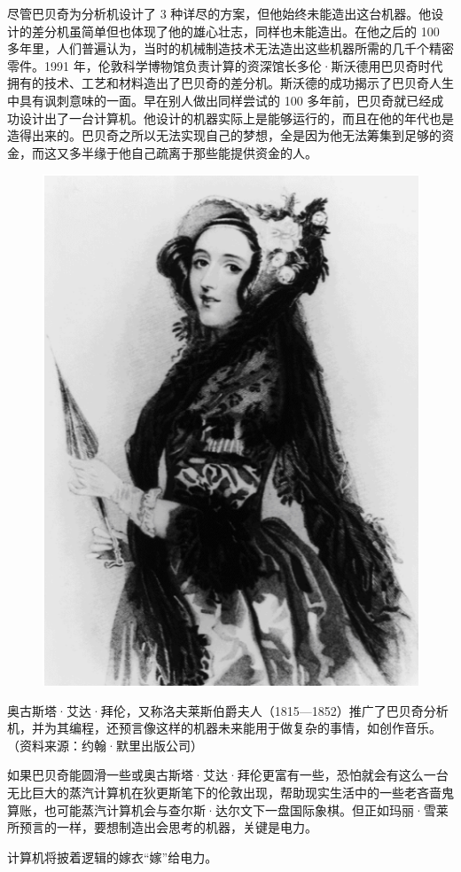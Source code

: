 \documentclass[12pt,UTF8]{ctexbook}
\begin{document}
尽管巴贝奇为分析机设计了 3 种详尽的方案，但他始终未能造出这台机器。他设计的差分机虽简单但也体现了他的雄心壮志，同样也未能造出。在他之后的 100 多年里，人们普遍认为，当时的机械制造技术无法造出这些机器所需的几千个精密零件。1991 年，伦敦科学博物馆负责计算的资深馆长多伦·斯沃德用巴贝奇时代拥有的技术、工艺和材料造出了巴贝奇的差分机。斯沃德的成功揭示了巴贝奇人生中具有讽刺意味的一面。早在别人做出同样尝试的 100 多年前，巴贝奇就已经成功设计出了一台计算机。他设计的机器实际上是能够运行的，而且在他的年代也是造得出来的。巴贝奇之所以无法实现自己的梦想，全是因为他无法筹集到足够的资金，而这又多半缘于他自己疏离于那些能提供资金的人。

\begin{figure}[htbp]
	\centering
	\includegraphics[width=0.7\linewidth]{2}
	\caption{}
	\label{fig:1}
\end{figure}

奥古斯塔·艾达·拜伦，又称洛夫莱斯伯爵夫人（1815—1852）推广了巴贝奇分析机，并为其编程，还预言像这样的机器未来能用于做复杂的事情，如创作音乐。（资料来源：约翰·默里出版公司）

如果巴贝奇能圆滑一些或奥古斯塔·艾达·拜伦更富有一些，恐怕就会有这么一台无比巨大的蒸汽计算机在狄更斯笔下的伦敦出现，帮助现实生活中的一些老吝啬鬼算账，也可能蒸汽计算机会与查尔斯·达尔文下一盘国际象棋。但正如玛丽·雪莱所预言的一样，要想制造出会思考的机器，关键是电力。

计算机将披着逻辑的嫁衣“嫁”给电力。
\end{document}
